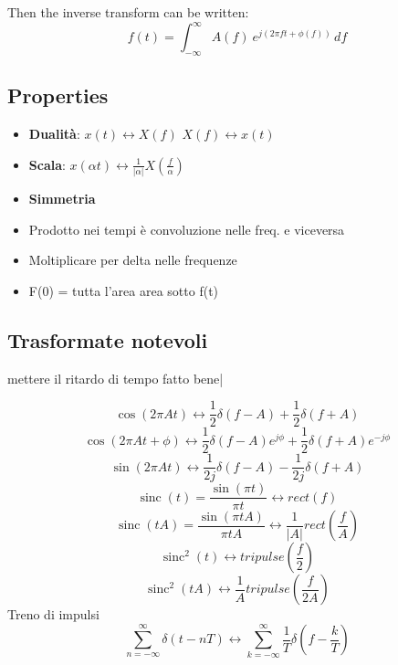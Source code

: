\documentclass[12pt,a4paper,]{article}
\begin{document}
Then the inverse transform can be written:
\begin{equation}
f(t) = \int _{-\infty}^\infty A(f)\ e^{ j\left(2\pi f t +\phi (f)\right)}\,df
\end{equation}



\subsection{Properties}
 \begin{itemize}
 \item  \textbf{Dualità}: $ x(t) \longleftrightarrow X(f)$ $ X(f)\longleftrightarrow x(t)$
 \item \textbf{Scala}: $ x(\alpha t)  \longleftrightarrow \frac{1}{|\alpha|}X(\frac{f}{\alpha})$
 \item \textbf{Simmetria}
 \item Prodotto nei tempi è convoluzione nelle freq. e viceversa
 \item Moltiplicare per delta nelle frequenze 
 \item F(0) = tutta l'area  area sotto f(t)
  \end{itemize}
 \subsection{Trasformate notevoli}
 mettere il ritardo di tempo fatto bene|

\begin{equation}
  \cos(2\pi A t) \longleftrightarrow \frac{1}{2} \delta(f-A) + \frac{1}{2} \delta(f+A)
\end{equation}
\begin{equation}
  \cos(2\pi A t + \phi) \longleftrightarrow \frac{1}{2} \delta(f-A)e^{j\phi} + \frac{1}{2} \delta(f+A)e^{-j\phi}
\end{equation}
   \begin{equation}
 \sin(2\pi A t) \longleftrightarrow \frac{1}{2j} \delta(f-A) - \frac{1}{2j} \delta(f+A)
  \end{equation}
 \begin{equation}
 \operatorname{sinc}(t) = \frac{\sin(\pi t)}{\pi t}  \longleftrightarrow  rect(f) 
  \end{equation}
   \begin{equation}
 \operatorname{sinc}(tA) =  \frac{\sin(\pi tA)}{\pi tA}  \longleftrightarrow  \frac{1}{|A|} rect\left(\frac{f}{A}\right)
 \end{equation}
  \begin{equation}
 \operatorname{sinc}^{2}(t)   \longleftrightarrow  tripulse(\frac{f}{2})
 \end{equation}
 \begin{equation}
 \operatorname{sinc}^{2}(tA)   \longleftrightarrow \frac{1}{A}  tripulse(\frac{f}{2A})
  \end{equation}
 Treno di impulsi
 \begin{equation}
  \sum_{n=-\infty}^{\infty}  \delta(t-nT) \longleftrightarrow  \sum_{k=-\infty}^{\infty}  \frac{1}{T} \delta \left(f-\frac{k}{T}\right)
 \end{equation}
 
\end{document}
